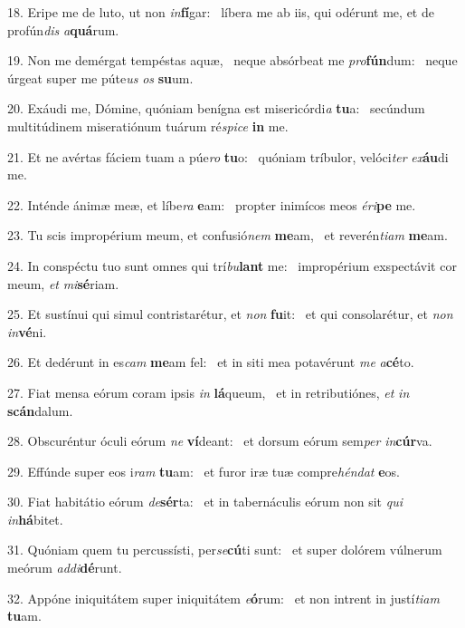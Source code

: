 18. Eripe me de luto, ut non \textit{in}\textbf{fí}gar: \ast\  líbera me ab iis, qui odérunt me, et de profún\textit{dis} \textit{a}\textbf{quá}rum.\

19. Non me demérgat tempéstas aquæ, \dag\  neque absórbeat me \textit{pro}\textbf{fún}dum: \ast\  neque úrgeat super me púte\textit{us} \textit{os} \textbf{su}um.\

20. Exáudi me, Dómine, quóniam benígna est misericórdi\textit{a} \textbf{tu}a: \ast\  secúndum multitúdinem miseratiónum tuárum ré\textit{spi}\textit{ce} \textbf{in} me.\

21. Et ne avértas fáciem tuam a púe\textit{ro} \textbf{tu}o: \ast\  quóniam tríbulor, velóci\textit{ter} \textit{ex}\textbf{áu}di me.\

22. Inténde ánimæ meæ, et líbe\textit{ra} \textbf{e}am: \ast\  propter inimícos meos \textit{é}\textit{ri}\textbf{pe} me.\

23. Tu scis impropérium meum, et confusió\textit{nem} \textbf{me}am, \ast\  et reverén\textit{ti}\textit{am} \textbf{me}am.\

24. In conspéctu tuo sunt omnes qui trí\textit{bu}\textbf{lant} me: \ast\  impropérium exspectávit cor meum, \textit{et} \textit{mi}\textbf{sé}riam.\

25. Et sustínui qui simul contristarétur, et \textit{non} \textbf{fu}it: \ast\  et qui consolarétur, et \textit{non} \textit{in}\textbf{vé}ni.\

26. Et dedérunt in es\textit{cam} \textbf{me}am fel: \ast\  et in siti mea potavérunt \textit{me} \textit{a}\textbf{cé}to.\

27. Fiat mensa eórum coram ipsis \textit{in} \textbf{lá}queum, \ast\  et in retributiónes, \textit{et} \textit{in} \textbf{scán}dalum.\

28. Obscuréntur óculi eórum \textit{ne} \textbf{ví}deant: \ast\  et dorsum eórum sem\textit{per} \textit{in}\textbf{cúr}va.\

29. Effúnde super eos i\textit{ram} \textbf{tu}am: \ast\  et furor iræ tuæ compre\textit{hén}\textit{dat} \textbf{e}os.\

30. Fiat habitátio eórum \textit{de}\textbf{sér}ta: \ast\  et in tabernáculis eórum non sit \textit{qui} \textit{in}\textbf{há}bitet.\

31. Quóniam quem tu percussísti, per\textit{se}\textbf{cú}ti sunt: \ast\  et super dolórem vúlnerum meórum \textit{ad}\textit{di}\textbf{dé}runt.\

32. Appóne iniquitátem super iniquitátem \textit{e}\textbf{ó}rum: \ast\  et non intrent in justí\textit{ti}\textit{am} \textbf{tu}am.\

